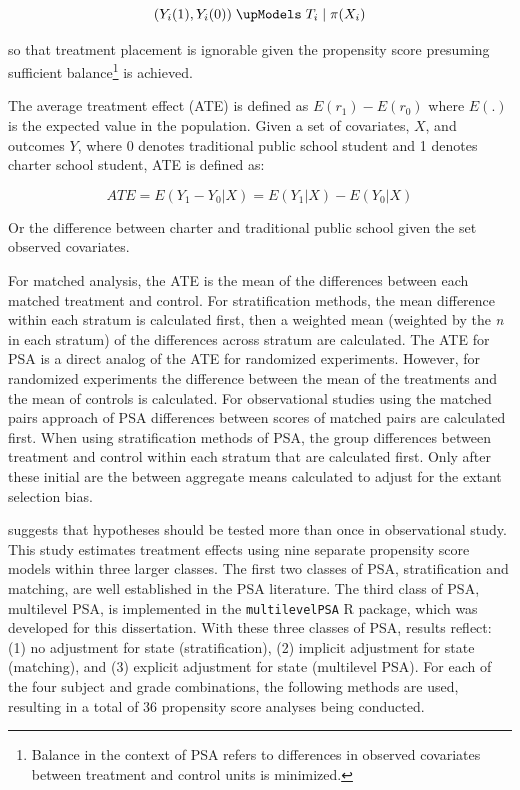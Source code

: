 \documentclass[letterpaper,12pt]{article} %
\begin{document}
\begin{equation}
({ Y }_{ i }(1),{ Y }_{ i }(0)) \; \upModels \; { T }_{ i } \; | \; \pi({ X }_{ i })
\end{equation}

\noindent so that treatment placement is ignorable given the propensity score presuming sufficient balance\footnote{Balance in the context of PSA refers to differences in observed covariates between treatment and control units is minimized.} is achieved.

The average treatment effect (ATE) is defined as $E(r_1) - E(r_0)$ where $E(.)$ is the expected value in the population. Given a set of covariates, $X$, and outcomes $Y$, where 0 denotes traditional public school student and 1 denotes charter school student, ATE is defined as:

\begin{equation}
ATE=E(Y_{1}-Y_{0}|X)=E(Y_{1}|X)-E(Y_{0}|X)
\end{equation}
 
\noindent Or the difference between charter and traditional public school given the set observed covariates.

For matched analysis, the ATE is the mean of the differences between each matched treatment and control. For stratification methods, the mean difference within each stratum is calculated first, then a weighted mean (weighted by the \textit{n} in each stratum) of the differences across stratum are calculated. The ATE for PSA is a direct analog of the ATE for randomized experiments. However, for randomized experiments the difference between the mean of the treatments and the mean of controls is calculated. For observational studies using the matched pairs approach of PSA differences between scores of matched pairs are calculated first. When using stratification methods of PSA, the group differences between treatment and control within each stratum that are calculated first. Only after these initial are the between aggregate means calculated to adjust for the extant selection bias.

 suggests that hypotheses should be tested more than once in observational study. This study estimates treatment effects using nine separate propensity score models within three larger classes. The first two classes of PSA, stratification and matching, are well established in the PSA literature. The third class of PSA, multilevel PSA, is implemented in the \texttt{multilevelPSA} R package, which was developed for this dissertation. With these three classes of PSA, results reflect: (1) no adjustment for state (stratification), (2) implicit adjustment for state (matching), and (3) explicit adjustment for state (multilevel PSA). For each of the four subject and grade combinations, the following methods are used, resulting in a total of 36 propensity score analyses being conducted.
\end{document}
